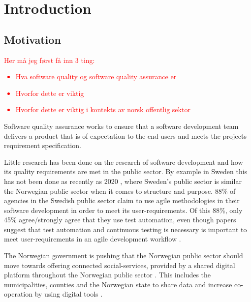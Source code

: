 \chapter{Introduction}

\section{Motivation}

\textcolor{red}{Her må jeg først få inn 3 ting:
\begin{itemize}
    \item Hva software quality og software quality assurance er
    \item Hvorfor dette er viktig
    \item Hvorfor dette er viktig i kontekts av norsk offentlig sektor
\end{itemize}
}
Software quality assurance works to ensure that a software development team delivers a product that is of expectation to the end-users and meets the projects requirement specification.


Little research has been done on the research of software development and how its quality requirements are met in the public sector. By example in Sweden this has not been done as recently as 2020 \cite{mb_2020}, where Sweden's public sector is similar the Norwegian public sector when it comes to structure and purpose. 88\% of agencies in the Swedish public sector claim to use agile methodologies in their software development in order to meet its user-requirements. Of this 88\%, only 45\% agree/strongly agree that they use test automation, even though papers suggest that test automation and continuous testing is necessary is important to meet user-requirements in an agile development workflow \cite{vk_2010}.

The Norwegian government is pushing that the Norwegian public sector should move towards offering connected social-services, provided by a shared digital platform throughout the Norwegian public sector \cite{r_2019}. This includes the municipalities, counties and the Norwegian state to share data and increase co-operation by using digital tools \cite{r_2019}.

